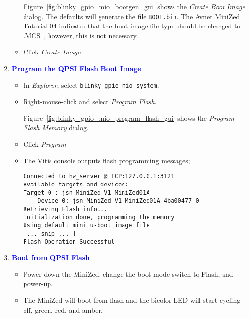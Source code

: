 \begin{enumerate}
\begin{itemize}
Figure~\ref{fig:blinky_gpio_mio_bootgen_gui} shows the 
\emph{Create Boot Image} dialog.
The defaults will generate the file \verb+BOOT.bin+. 
The Avnet MiniZed Tutorial 04 indicates that the boot image file type 
should be changed to .MCS~\cite{Avnet_MiniZed_Tutorial04_2018}, 
however, this is not necessary.

\item Click \emph{Create Image}
\end{itemize}

\item \textcolor{blue}{\textbf{Program the QPSI Flash Boot Image}}
%
\begin{itemize}
\item In \emph{Explorer}, select \verb+blinky_gpio_mio_system+.
\item Right-mouse-click and select \emph{Program Flash}.

Figure~\ref{fig:blinky_gpio_mio_program_flash_gui} shows the 
\emph{Program Flash Memory} dialog.

\item Click \emph{Program}

\item The Vitis console outputs flash programming messages;
\begin{verbatim}
Connected to hw_server @ TCP:127.0.0.1:3121
Available targets and devices:
Target 0 : jsn-MiniZed V1-MiniZed01A
	Device 0: jsn-MiniZed V1-MiniZed01A-4ba00477-0
Retrieving Flash info...
Initialization done, programming the memory
Using default mini u-boot image file 
[... snip ... ]
Flash Operation Successful
\end{verbatim}
\end{itemize}

\item \textcolor{blue}{\textbf{Boot from QPSI Flash}}
%
\begin{itemize}
\item Power-down the MiniZed, change the boot mode switch to Flash, 
and power-up.

\item The MiniZed will boot from flash and the bicolor LED will start 
cycling off, green, red, and amber. 


\end{itemize}
\end{enumerate}

